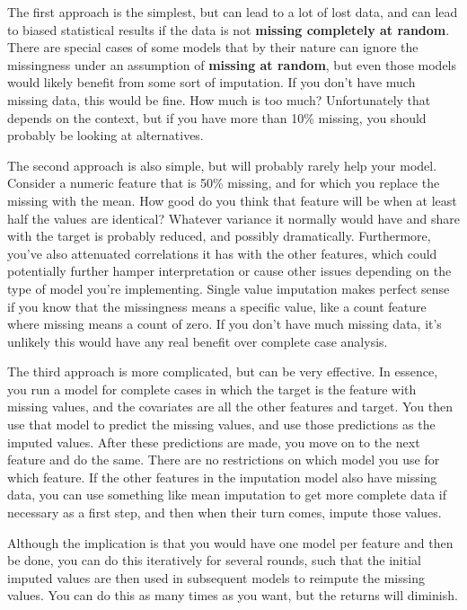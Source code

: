\documentclass[
  letterpaper,
]{krantz}
\begin{document}
The first approach is the simplest, but can lead to a lot of lost data,
and can lead to biased statistical results if the data is not
\textbf{missing completely at random}. There are special cases of some
models that by their nature can ignore the missingness under an
assumption of \textbf{missing at random}, but even those models would
likely benefit from some sort of imputation. If you don't have much
missing data, this would be fine. How much is too much? Unfortunately
that depends on the context, but if you have more than 10\% missing, you
should probably be looking at alternatives.

The second approach is also simple, but will probably rarely help your
model. Consider a numeric feature that is 50\% missing, and for which
you replace the missing with the mean. How good do you think that
feature will be when at least half the values are identical? Whatever
variance it normally would have and share with the target is probably
reduced, and possibly dramatically. Furthermore, you've also attenuated
correlations it has with the other features, which could potentially
further hamper interpretation or cause other issues depending on the
type of model you're implementing. Single value imputation makes perfect
sense if you know that the missingness means a specific value, like a
count feature where missing means a count of zero. If you don't have
much missing data, it's unlikely this would have any real benefit over
complete case analysis.

The third approach is more complicated, but can be very effective. In
essence, you run a model for complete cases in which the target is the
feature with missing values, and the covariates are all the other
features and target. You then use that model to predict the missing
values, and use those predictions as the imputed values. After these
predictions are made, you move on to the next feature and do the same.
There are no restrictions on which model you use for which feature. If
the other features in the imputation model also have missing data, you
can use something like mean imputation to get more complete data if
necessary as a first step, and then when their turn comes, impute those
values.

Although the implication is that you would have one model per feature
and then be done, you can do this iteratively for several rounds, such
that the initial imputed values are then used in subsequent models to
reimpute the missing values. You can do this as many times as you want,
but the returns will diminish.
\end{document}
